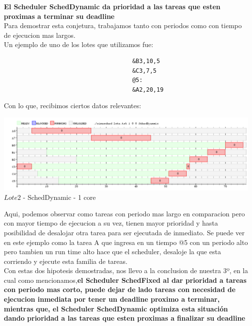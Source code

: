 \textbf{El Scheduler SchedDynamic da prioridad a las tareas que esten proximas a terminar su deadline}\\

Para demostrar esta conjetura, trabajamos tanto con periodos como con tiempo de ejecucion mas largos.\\

Un ejemplo de uno de los lotes que utilizamos fue:\\
\begin{verbatim}
                                     &B3,10,5
                                     &C3,7,5
                                     @5: 
                                     &A2,20,19
\end{verbatim}

Con lo que, recibimos ciertos datos relevantes:\\

\begin{center}
    	\includegraphics[width=450pt]{Dynamicej8b.png}
	{$Lote 2$ - SchedDynamic - 1 core }	
 \end{center}

Aqui, podemos observar como tareas con periodo mas largo en comparacion pero con mayor tiempo de ejecucion a su vez, tienen
mayor prioridad y hasta posibilidad de desalojar otra tarea para ser ejecutada de inmediato. Se puede ver en este ejemplo
como la tarea A que ingresa en un tiempo @5 con un periodo alto pero tambien un run time alto hace que el scheduler, desaloje
la que esta corriendo y ejecute esta familia de tareas.\\

Con estas dos hipotesis demostradas, nos llevo a la conclusion de nuestra 3º, en la cual como mencionamos,\textbf{el Scheduler SchedFixed
al dar prioridad a tareas con periodo mas corto, puede dejar de lado tareas con necesidad de ejecucion inmediata por tener un deadline
proximo a terminar, mientras que, el Scheduler SchedDynamic optimiza esta situación dando prioridad a las tareas que esten
proximas a finalizar su deadline}\\

